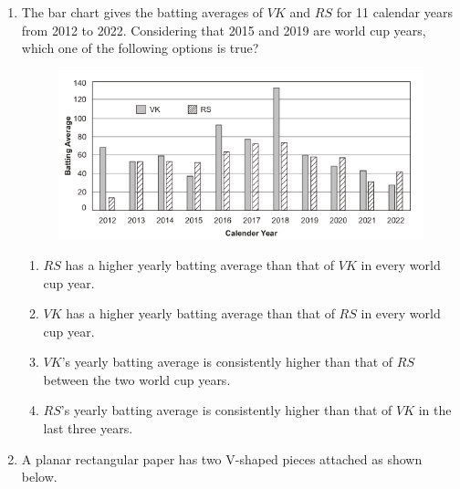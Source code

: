 \documentclass[journal,12pt,onecolumn]{IEEEtran}
\theoremstyle{remark}
\begin{document}
\begin{enumerate}
\item The bar chart gives the batting averages of $VK$ and $RS$ for 11 calendar years from 2012 to 2022. Considering that 2015 and 2019 are world cup years, which one of the following options is true?
\begin{figure}
    \centering
    \includegraphics[width=0.5\linewidth]{figs/fig.png}
    \end{figure}
\begin{enumerate}
    \item $RS$ has a higher yearly batting average than that of $VK$ in every world cup year.
    \item $VK$ has a higher yearly batting average than that of $RS$ in every world cup year.
    \item $VK$'s yearly batting average is consistently higher than that of $RS$ between the two world cup years.
    \item $RS$'s yearly batting average is consistently higher than that of $VK$ in the last three years.
\end{enumerate}
\item A planar rectangular paper has two V-shaped pieces attached as shown below.
\begin{figure}[H]
\centering
{}%


\end{figure}
\end{enumerate}
\end{document}
